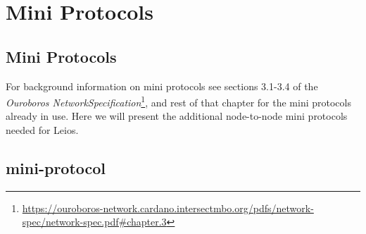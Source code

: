 \chapter{Mini Protocols}
\label{chapter:mini-protocols}

\newcommand{\Producer}{\textcolor{mygreen}{\textbf{Producer}}}
\newcommand{\Consumer}{\textcolor{myblue}{\textbf{Consumer}}}

\newcommand{\miniProtocolsUrl}{\url{https://ouroboros-network.cardano.intersectmbo.org/pdfs/network-spec/network-spec.pdf\#chapter.3}}
\section{Mini Protocols}
For background information on mini protocols see sections 3.1-3.4 of
the \emph{Ouroboros NetworkSpecification}\footnote{\miniProtocolsUrl},
and rest of that chapter for the mini protocols already in use. Here
we will present the additional node-to-node mini protocols needed for
Leios.

\newcommand{\miniEntry}[5]{
  \begin{framed}
      \noindent\textbf{#1}\hfill  Section \ref{#2}
      \newline {#3}
      \newline {\href{#5}{\small\texttt{#4}}}
  \end{framed}
}

\newcommand{\relay}{\text{Relay}}
\newcommand{\catchup}{\text{CatchUp}}
\newcommand{\fetch}{\text{Fetch}}

\section{\relay{} mini-protocol}
\label{ptcl:relay}

\newcommand{\StInit}  {\state{StInit}}
\newcommand{\MsgInit} {\trans{MsgInit}}
\newcommand{\StIdsBlocking}    {\state{StIdsBlocking}}
\newcommand{\StIdsNonBlocking} {\state{StIdsNonBlocking}}
\newcommand{\StData}              {\state{StData}}
\newcommand{\MsgRequestIdsNB}  {\trans{MsgRequestIdsNonBlocking}}
\newcommand{\MsgRequestIdsB}   {\trans{MsgRequestIdsBlocking}}
\newcommand{\MsgReplyIds}      {\trans{MsgReplyIds}}
\newcommand{\MsgReplyIdsAndAnns}  {\trans{MsgReplyIdsAndAnns}}
\newcommand{\MsgReplyIdsSlashAnns}  {\trans{MsgReplyIds\langle AndAnns\rangle}}
\newcommand{\MsgRequestData}      {\trans{MsgRequestData}}
\newcommand{\MsgReplyData}        {\trans{MsgReplyData}}
\newcommand{\option}[1]{\text{#1}}
\newcommand{\BoundedWindow} {\option{BoundedWindow}}
\newcommand{\Announcements} {\option{Announcements}}
\newcommand{\annCond}{\text{Ann. Condition}}
\newcommand{\info}{\text{info}}
\newcommand{\ann}{\text{ann}}
\newcommand{\ack}{\text{ack}}
\newcommand{\req}{\text{req}}
\newcommand{\id}{\text{id}}
\newcommand{\datum}{\text{datum}}
\newcommand{\parameter}{\text{parameter}}

